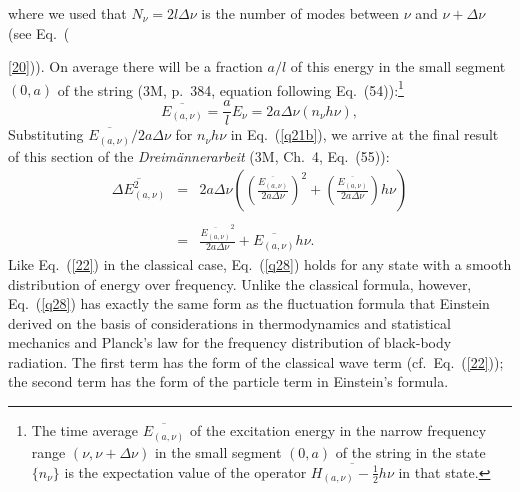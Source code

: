 \documentclass{elsart}
\begin{document}
where we used that $N_\nu = 2l \Delta \nu$ is the number of modes between $\nu$ and $\nu + \Delta \nu$ (see Eq.\ ({\ref{20})).
On average there will be a fraction $a/l$ of this energy in the small segment $(0,a)$ of the string (3M, p.\ 384, equation following Eq.\ (54)):\footnote{The time average $\overline{E_{(a, \nu)}}$ of the excitation energy  in the narrow frequency range $(\nu, \nu + \Delta \nu)$ in the small segment $(0,a)$ of the string in the state $\{ n_\nu \}$  is the expectation value of the operator $\overline{H_{(a, \nu)} - \frac{1}{2} h \nu}$ in that state.} 
\begin{equation}
\overline{E_{(a, \nu)}} = \frac{a}{l} E_\nu = 2 a \Delta \nu (n_\nu h \nu),
\label{q25}
\end{equation}
Substituting $\overline{E_{(a, \nu)}}/2a\Delta \nu$ for $n_\nu  h \nu$ in Eq.\ (\ref{q21b}), we arrive at the final result of this section of the {\it Dreim\"annerarbeit} (3M, Ch.\ 4, Eq.\ (55)):
\begin{eqnarray}
\overline{\Delta E_{(a, \nu)}^2} &
=  & 2a \Delta \nu \left( \left( \frac{\overline{E_{(a, \nu)}}}{2a\Delta \nu} \right)^2 
 + \left( \frac{\overline{E_{(a, \nu)}}}{2a\Delta \nu} \right) h \nu \right) \nonumber \\
 & &  \label{q28} \\
 & = &   \frac{\overline{E_{(a, \nu)}}^2}{2a\Delta \nu} + \overline{E_{(a, \nu)}} h \nu. \nonumber
\end{eqnarray}
Like Eq.\ (\ref{22}) in the classical case, Eq.\ (\ref{q28}) holds for any state with a smooth distribution of energy over frequency. Unlike the classical formula, however, Eq.\ (\ref{q28}) has exactly the same form as the fluctuation formula that Einstein derived on the basis of considerations in thermodynamics and statistical mechanics and Planck's law for the frequency distribution of black-body radiation. The first term has the form of the classical wave term (cf.\ Eq.\ (\ref{22})); the second term has the form of the particle term in Einstein's formula. 

}
\end{document}
